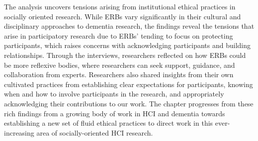  The analysis uncovers tensions arising from institutional ethical practices in socially oriented research. While ERBs vary significantly in their cultural and disciplinary approaches to dementia research, the findings reveal the tensions that arise in participatory research due to ERBs’ tending to focus on protecting participants, which raises concerns with acknowledging participants and building relationships. Through the interviews, researchers reflected on how ERBs could be more reflexive bodies, where researchers can seek support, guidance, and collaboration from experts. Researchers also shared insights from their own cultivated practices from establishing clear expectations for participants, knowing when and how to involve participants in the research, and appropriately acknowledging their contributions to our work. The chapter progresses from these rich findings from a growing body of work in HCI and dementia towards establishing a new set of fluid ethical practices to direct work in this ever-increasing area of socially-oriented HCI research. 





